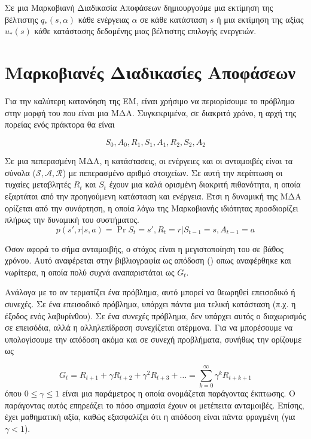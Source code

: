 Σε μια Μαρκοβιανή Διαδικασία Αποφάσεων δημιουργούμε μια εκτίμηση της βέλτιστης $q_*(s,α)$ κάθε
ενέργειας $α$ σε κάθε κατάσταση $s$ ή μια εκτίμηση της αξίας $u_*(s)$ κάθε κατάστασης δεδομένης
μιας βέλτιστης επιλογής ενεργειών.

\section{Μαρκοβιανές Διαδικασίες Αποφάσεων}

Για την καλύτερη κατανόηση της ΕΜ, είναι χρήσιμο να περιορίσουμε το πρόβλημα στην μορφή του  που είναι μια ΜΔΑ. Συγκεκριμένα, σε διακριτό χρόνο, η αρχή της πορείας ενός πράκτορα θα είναι

\begin{equation*}
    S_0, A_0, R_1, S_1, A_1, R_2, S_2, A_2
\end{equation*}

Σε μια πεπερασμένη ΜΔΑ, η κατάστασεις, οι ενέργειες και οι ανταμοιβές είναι τα σύνολα
($\mathcal{S}, \mathcal{A}, \mathcal{R}$) με πεπερασμένο αριθμό στοιχείων. Σε αυτή την περίπτωση οι τυχαίες μεταβλητές $R_t$ και $S_t$ έχουν μια καλά ορισμένη διακριτή πιθανότητα, η οποία εξαρτάται από την προηγούμενη κατάσταση και ενέργεια. Έτσι η δυναμική της ΜΔΑ ορίζεται από την συνάρτηση, η οποία λόγω της Μαρκοβιανής ιδιότητας προσδιορίζει πλήρως την δυναμική του συστήματος.
\begin{equation}
    p(s', r | s, a) = \Pr{S_t = s', R_t = r | S_{t-1} = s, A_{t-1} = a }
\end{equation}

Όσον αφορά το σήμα ανταμοιβής, ο στόχος είναι η μεγιστοποίηση του σε βάθος χρόνου. Αυτό αναφέρεται στην βιβλιογραφία ως απόδοση () οπως αναφέρθηκε και νωρίτερα, η οποία πολύ συχνά αναπαριστάται ως $G_t$.

Ανάλογα με το αν τερματίζει ένα πρόβλημα, αυτό μπορεί να θεωρηθεί επεισοδικό ή συνεχές. Σε ένα επεισοδικό πρόβλημα, υπάρχει πάντα μια τελική κατάσταση (π.χ. η έξοδος ενός λαβυρίνθου).
Σε ένα συνεχές πρόβλημα, δεν υπάρχει αυτός ο διαχωρισμός σε επεισόδια, αλλά η αλληλεπίδραση συνεχίζεται ατέρμονα. Για να μπορέσουμε να υπολογίσουμε την απόδοση ακόμα και σε συνεχή προβλήματα, συνήθως την ορίζουμε ως

\begin{equation}
    G_t = R_{t+1} + γ R_{t+2} + γ^2 R_{t+3} + \ldots = \sum_{k=0}^{\infty}γ^k R_{t+k+1}
\end{equation}
όπου $ 0 \leq γ \leq 1$ είναι μια παράμετρος η οποία ονομάζεται παράγοντας έκπτωσης. Ο παράγοντας αυτός επηρεάζει το πόσο σημασία έχουν οι μετέπειτα ανταμοιβές. Επίσης, έχει μαθηματική αξία, καθώς εξασφαλίζει ότι η απόδοση είναι πάντα φραγμένη (για $γ < 1$).


